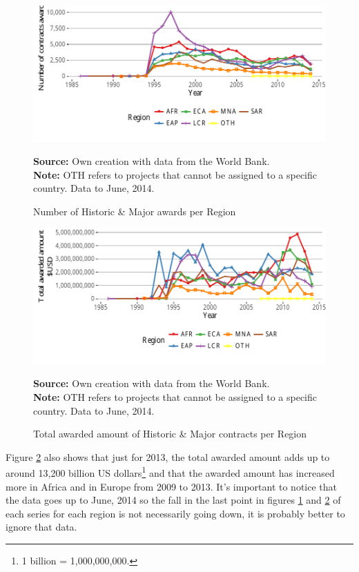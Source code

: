 \begin{figure}[H]
\begin{center}
\caption{Number of Historic \& Major awards per Region}
\label{fig_major_number}
\includegraphics[max width=.95\textwidth]{../img/major_historic_region.pdf}
\end{center}
\noindent \footnotesize{\textbf{Source:} Own creation with data from the World Bank.}\\
\noindent \footnotesize{\textbf{Note:} OTH refers to projects that cannot be assigned to a specific country. Data to June, 2014.}
\end{figure}

\begin{figure}[H]
\begin{center}
\caption{Total awarded amount of Historic \& Major contracts per Region}
\label{fig_major_awarded_usd}
\includegraphics[max width=.95\textwidth]{../img/major_historic_region_awarded_usd.pdf}
\end{center}
\noindent \footnotesize{\textbf{Source:} Own creation with data from the World Bank.}\\
\noindent \footnotesize{\textbf{Note:} OTH refers to projects that cannot be assigned to a specific country. Data to June, 2014.}
\end{figure}


Figure \ref{fig_major_awarded_usd} also shows that just for 2013, the total awarded amount adds up to around 13,200 billion US dollars\footnote{1 billion = 1,000,000,000.} and that the awarded amount has increased more in Africa and in Europe from 2009 to 2013. 
It's important to notice that the data goes up to June, 2014 so the fall in the last point in figures  \ref{fig_major_number} and \ref{fig_major_awarded_usd} of each series for each region is not necessarily going down, it is probably better to ignore that data.


